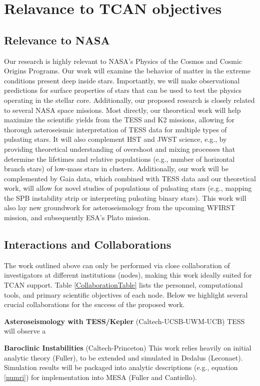 {\color{orange}

\section{Relavance to TCAN objectives}

}

\subsection{Relevance to NASA}

Our research is highly relevant to NASA's Physics of the Cosmos and Cosmic Origins Programs. Our work will examine the behavior of matter in the extreme conditions present deep inside stars. Importantly, we will make observational predictions for surface properties of stars that can be used to test the physics operating in the stellar core. Additionally, our proposed research is closely related to several NASA space missions. Most directly, our theoretical work will help maximize the scientific yields from the TESS and K2 missions, allowing for thorough asteroseismic interpretation of TESS data for multiple types of pulsating stars. It will also complement HST and JWST science, e.g., by providing theoretical understanding of overshoot and mixing processes that determine the lifetimes and relative populations (e.g., number of horizontal branch stars) of low-mass stars in clusters. Additionally, our work will be complemented by Gaia data, which combined with TESS data and our theoretical work, will allow for novel studies of populations of pulsating stars (e.g., mapping the SPB instability strip or interpreting pulsating binary stars). This work will also lay new groundwork for asteroseismology from the upcoming WFIRST mission, and subsequently ESA's Plato mission. 


\subsection{Interactions and Collaborations}

The work outlined above can only be performed via close collaboration of investigators at different institutions (nodes), making this work ideally suited for TCAN support. Table \ref{CollaborationTable} lists the personnel, computational tools, and primary scientific objectives of each node. Below we highlight several crucial collaborations for the success of the proposed work.

{\bf Asteroseismology with TESS/Kepler} (Caltech-UCSB-UWM-UCB) TESS will observe a  

{\bf Baroclinic Instabilities} (Caltech-Princeton) This work relies heavily on initial analytic theory (Fuller), to be extended and simulated in Dedalus (Leconaet). Simulation results will be packaged into analytic descriptions (e.g., equation \ref{numri}) for implementation into MESA (Fuller and Cantiello).

